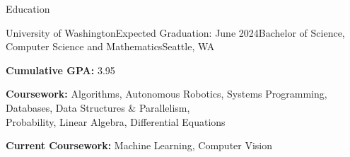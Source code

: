 \documentclass{resume} %
\begin{document}
\vspace{-0.5em} %


\begin{rSection}{Education}

\begin{education}{University of Washington}{Expected Graduation: June 2024}{Bachelor of Science, Computer Science and Mathematics}{Seattle, WA}
\item \textbf{Cumulative GPA:} 3.95
\item \textbf{Coursework:} Algorithms, Autonomous Robotics, Systems Programming, Databases, Data Structures \& Parallelism, \\ Probability, Linear Algebra, Differential Equations
\item \textbf{Current Coursework:} Machine Learning, Computer Vision
\end{education}

\end{rSection}

\end{document}
